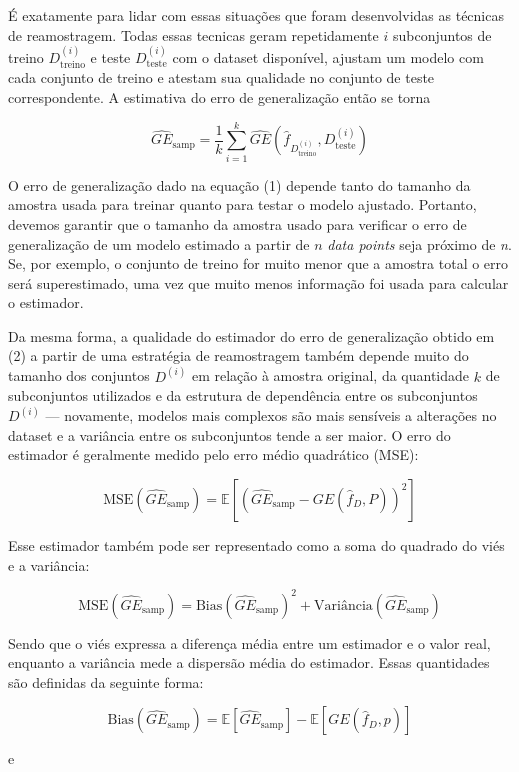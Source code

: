 \documentclass[
  12pt,
  oneside,
  a4paper,
  chapter=TITLE,
  section=TITLE,
  brazil]{abntex2}
\begin{document}
É exatamente para lidar com essas situações que foram desenvolvidas as
técnicas de reamostragem. Todas essas tecnicas geram repetidamente \(i\)
subconjuntos de treino \(D_{\text{treino}}^{(i)}\) e teste
\(D_{\text{teste}}^{(i)}\) com o dataset disponível, ajustam um modelo
com cada conjunto de treino e atestam sua qualidade no conjunto de teste
correspondente. A estimativa do erro de generalização então se torna

\[\widehat{GE}_\text{samp} = \frac{1}{k}\sum_{i=1}^{k}\widehat{GE}(\hat{f}_{D_{\text{treino}}^{(i)}}, D_{\text{teste}}^{(i)}) \tag{2}\]

O erro de generalização dado na equação (1) depende tanto do tamanho da
amostra usada para treinar quanto para testar o modelo ajustado.
Portanto, devemos garantir que o tamanho da amostra usado para verificar
o erro de generalização de um modelo estimado a partir de \(n\)
\emph{data points} seja próximo de \emph{n}. Se, por exemplo, o conjunto
de treino for muito menor que a amostra total o erro será superestimado,
uma vez que muito menos informação foi usada para calcular o estimador.

Da mesma forma, a qualidade do estimador do erro de generalização obtido
em (2) a partir de uma estratégia de reamostragem também depende muito
do tamanho dos conjuntos \(D^{(i)}\) em relação à amostra original, da
quantidade \(k\) de subconjuntos utilizados e da estrutura de
dependência entre os subconjuntos \(D^{(i)}\) --- novamente, modelos
mais complexos são mais sensíveis a alterações no dataset e a variância
entre os subconjuntos tende a ser maior. O erro do estimador é
geralmente medido pelo erro médio quadrático (MSE):

\[\text{MSE}(\widehat{GE}_\text{samp}) = \mathbb{E}[(\widehat{GE}_\text{samp} - GE(\hat{f}_D, P))^2]\]

Esse estimador também pode ser representado como a soma do quadrado do
viés e a variância:

\[\text{MSE}(\widehat{GE}_\text{samp}) = \text{Bias}(\widehat{GE}_\text{samp})^2 + \text{Variância}(\widehat{GE}_\text{samp})\]

Sendo que o viés expressa a diferença média entre um estimador e o valor
real, enquanto a variância mede a dispersão média do estimador. Essas
quantidades são definidas da seguinte forma:

\[\text{Bias}(\widehat{GE}_\text{samp}) = \mathbb{E}[\widehat{GE}_\text{samp}] - \mathbb{E}[GE(\hat{f}_D, p)]\]

e
\end{document}
